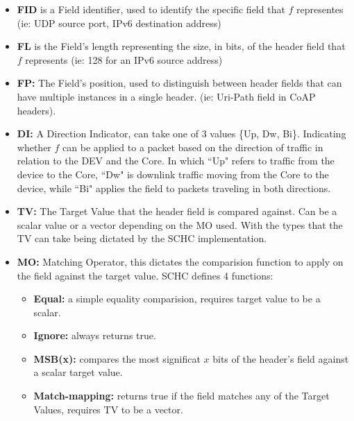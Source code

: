 \documentclass[12pt]{../dalthesis}
\begin{document}
	\begin{itemize}
		\item \textbf{FID} is a Field identifier, used to identify the specific field that $f$ representes 
			(ie: UDP source port, IPv6 destination address)


		\item \textbf{FL}
			is the Field's length representing the size, in bits, of the header field that $f$ represents (ie: 128 for an IPv6 source address)
		\item \textbf{FP:} 
			The Field's position, used to distinguish between header fields that can have multiple instances in a single header. 
			(ie: Uri-Path field in CoAP headers). 

		\item \textbf{DI:} 
			 A Direction Indicator, can take one of 3 values \{Up, Dw, Bi\}. Indicating whether $f$ can be applied to a packet based on the direction of traffic
			in relation to the DEV and the Core. In which ``Up" refers to traffic from the device to the Core, ``Dw" is downlink traffic moving from
			the Core to the device, while ``Bi" applies the field to packets traveling in both directions.

	\item \textbf{TV:}
			The Target Value that the header field is compared against. Can be a scalar value or a vector depending on the MO used. With the types that the 
			TV can take being dictated by the SCHC implementation.

	\item \textbf{MO:}
			Matching Operator, this dictates the comparision function to apply on the field against the target value. SCHC defines 4 functions:
			\begin{adjustwidth}{1em}{0em}
			\begin{itemize}
				\item  \textbf{Equal:} 
						a simple equality comparision, requires target value to be a scalar.
					\item \textbf{Ignore:}
						always returns true.
					\item \textbf{MSB(x):} 
						compares the most significat $x$ bits of the header's field against a scalar target value.
					\item \textbf{Match-mapping:}
					returns true if the field matches any of the Target Values, requires TV to be a vector.
			\end{itemize}	
			\end{adjustwidth}	
			


\end{itemize}
\end{document}
